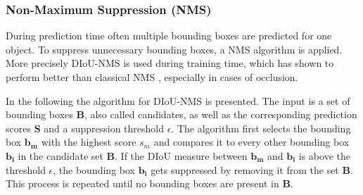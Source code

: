 \subsubsection{Non-Maximum Suppression (NMS)}

During prediction time often multiple bounding boxes are predicted for one object.
To suppress unnecessary bounding boxes, a \ac{NMS} algorithm is applied.
More precisely \ac{DIoU}-\ac{NMS} \cite{diou} is used during training time, which has shown to perform better than classical \ac{NMS} \cite{soft_nms}, especially in cases of occlusion.

In the following the algorithm for \ac{DIoU}-\ac{NMS} is presented.
The input is a set of bounding boxes $\mathbf{B}$, also called candidates, as well as the corresponding prediction scores $\mathbf{S}$ and a suppression threshold $\epsilon$.
The algorithm first selects the bounding box $\mathbf{b_m}$ with the highest score $s_m$ and compares it to every other bounding box $\mathbf{b_i}$ in the candidate set $\mathbf{B}$.
If the \ac{DIoU} measure between $\mathbf{b_m}$ and $\mathbf{b_i}$ is above the threshold $\epsilon$, the bounding box $\mathbf{b_i}$ gets suppressed by removing it from the set $\mathbf{B}$.
This process is repeated until no bounding boxes are present in $\mathbf{B}$.






